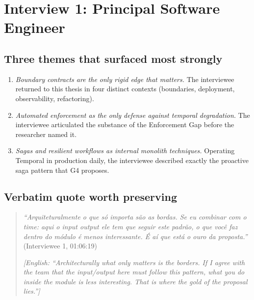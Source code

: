 
\section{Interview 1: Principal Software Engineer}
\label{sec:interview01}

\subsection*{Three themes that surfaced most strongly}

\begin{enumerate}[itemsep=3pt,topsep=2pt]
  \item \emph{Boundary contracts are the only rigid edge that matters.} The interviewee returned to this thesis in four distinct contexts (boundaries, deployment, observability, refactoring).
  \item \emph{Automated enforcement as the only defense against temporal degradation.} The interviewee articulated the substance of the Enforcement Gap before the researcher named it.
  \item \emph{Sagas and resilient workflows as internal monolith techniques.} Operating Temporal in production daily, the interviewee described exactly the proactive saga pattern that G4 proposes.
\end{enumerate}

\subsection*{Verbatim quote worth preserving}

\begin{quote}
\emph{``Arquiteturalmente o que só importa são as bordas. Se eu combinar com o time: aqui o input output ele tem que seguir este padrão, o que você faz dentro do módulo é menos interessante. É aí que está o ouro da proposta.''} (Interviewee 1, 01:06:19)

\medskip

\emph{[English: ``Architecturally what only matters is the borders. If I agree with the team that the input/output here must follow this pattern, what you do inside the module is less interesting. That is where the gold of the proposal lies.'']}
\end{quote}

